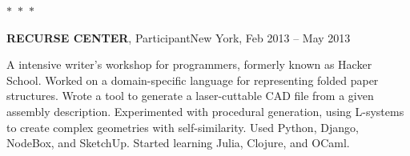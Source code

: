 \documentclass[margin]{res}
\begin{document}
\begin{resume}
\begin{center}
  $\ast$~$\ast$~$\ast$
\end{center}

		\textbf{RECURSE CENTER}, Participant\hfill New York, Feb 2013 --  May 2013

		A intensive writer's workshop for programmers, formerly known as Hacker School. Worked on a domain-specific language for representing folded paper structures. Wrote a tool to generate a laser-cuttable CAD file from a given assembly description. Experimented with procedural generation, using L-systems to create complex geometries with self-similarity. Used Python, Django, NodeBox, and SketchUp. Started learning Julia, Clojure, and OCaml.

\end{resume}
\end{document}
